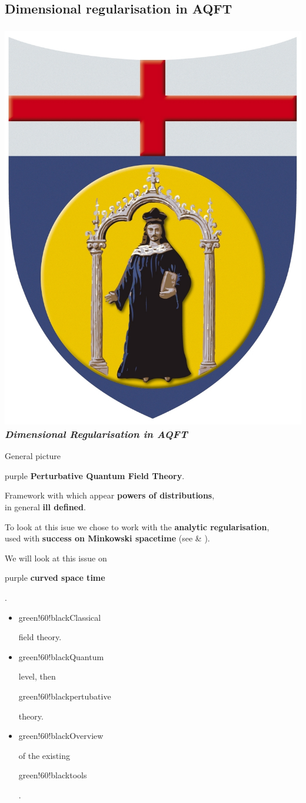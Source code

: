 \documentclass[a4paper,11pt]{beamer} %
\newcommand{\LogoUnivGenova}{\protect\includegraphics[scale=0.015]{fig_genova.JPG}} %
\begin{document}
\subsection{Dimensional regularisation in AQFT}

\begin{frame}
\frametitle{\LogoUnivGenova {} \emph{\small{Dimensional Regularisation in AQFT}}}
\begin{block}{General picture}
\vspace{-6mm}
\begin{setstretch}{1.4}
\begin{center} 
\begin{color}{purple}
\textbf{Perturbative Quantum Field Theory}. \\
\end{color}
Framework with which appear \textbf{powers of distributions}, \\
in general \textbf{ill defined}.\\
\begin{footnotesize}
To look at this isue we chose to work with the \textbf{analytic regularisation}, \\used with \textbf{success on Minkowski spacetime} (see \cite{Bollini1972} \& \cite{Hooft1972}). \\
\end{footnotesize}
We will look at this issue on \begin{color}{purple} \textbf{curved space time} \end{color}.
\end{center}
\end{setstretch}
\vspace{-4mm}
\begin{itemize}
\item \begin{color}{green!60!black}Classical\end{color} field theory.
\item \begin{color}{green!60!black}Quantum\end{color} level, then \begin{color}{green!60!black}pertubative\end{color} theory.
\item \begin{color}{green!60!black}Overview\end{color} of the existing \begin{color}{green!60!black}tools\end{color}.
\end{itemize}
\end{block}
\end{frame}
\end{document}
